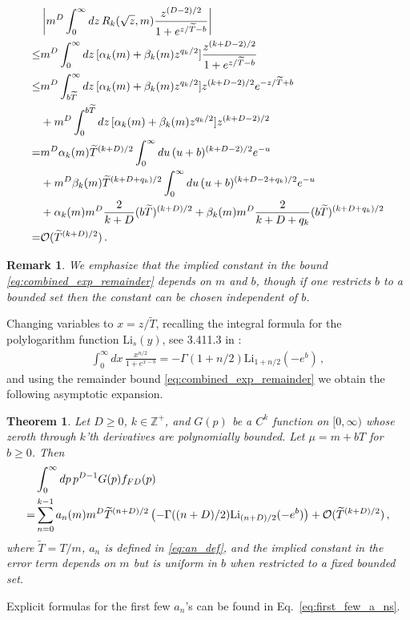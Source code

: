 \documentclass[sn-mathphys,Numbered]{sn-jnl}
\newtheorem{theorem}{Theorem}
\newtheorem{remark}{Remark}
\begin{document}
\begin{align}
 &\left|m^{D}\int_0^\infty dz\, R_k(\sqrt{z},m)\frac{z^{(D-2)/2}}{1+e^{z/\widetilde{T}-b}}\right|\\
 \leq&m^{D}\int_0^\infty dz\, [\alpha_k(m)+\beta_k(m)z^{q_k/2}]\frac{z^{(k+D-2)/2}}{1+e^{z/\widetilde{T}-b}}\notag\\
 \leq &m^{D}\int_{b\widetilde{T}}^\infty dz\, [\alpha_k(m)+\beta_k(m)z^{q_k/2}]z^{(k+D-2)/2}e^{-z/\widetilde{T}+b}\notag\\
 &+m^{D}\int_0^{{b\widetilde{T}}} dz\, [\alpha_k(m)+\beta_k(m)z^{q_k/2}]z^{(k+D-2)/2}\notag\\
 =&m^{D} \alpha_k(m)\widetilde{T}^{(k+D)/2}\int_{0}^\infty du\,(u+b)^{(k+D-2)/2}e^{-u}\notag\\
 &+m^D\beta_k(m)\widetilde{T}^{(k+D+q_k)/2}\int_{0}^\infty du\,(u+b)^{(k+D-2+q_k)/2}e^{-u}\notag\\
 &+\alpha_k(m)m^{D}\frac{2}{k+D}(b\widetilde{T})^{(k+D)/2}+\beta_k(m)m^{D}\frac{2}{k+D+q_k}(b\widetilde{T})^{(k+D+q_k)/2}\notag\\
 =&\mathcal{O}(\widetilde{T}^{(k+D)/2})\,.\label{eq:combined_exp_remainder}
\end{align}
\begin{remark}\label{remark:combined_remainder_uniform_in_b}
We emphasize that the implied constant in the bound \eqref{eq:combined_exp_remainder} depends on $m$ and $b$, though if one restricts $b$ to a bounded set then the constant can be chosen independent of $b$. 
\end{remark}

Changing variables to $x=z/\widetilde{T}$, recalling the integral formula for the polylogarithm function $\mathrm{Li}_s(y)$, see 3.411.3 in  \cite{Gradshteyn:1943cpj}:
\begin{align}\label{eq:h_decomp_eval}
   \int_0^\infty dx \, \frac{x^{n/2}}{1+e^{x-b}}    =-\Gamma(1+n/2)\mathrm{Li}_{1+n/2}(-e^b)\,,
\end{align}
and using the  remainder bound \eqref{eq:combined_exp_remainder} we obtain the following asymptotic expansion.
\begin{theorem}\label{thm:asymp_FD_int_Delta_mu_small}
Let $D\geq 0$, $k\in\mathbb{Z}^+$, and $G(p)$ be a  $C^k$ function on $[0,\infty)$ whose zeroth through $k$'th derivatives are polynomially bounded.  Let $\mu=m+bT$ for $b\geq 0$. Then
\begin{align}\label{eq:asymp_FD_int}
&\int_0^\infty dp\, p^{D-1} G(p) f_{FD}(p)\notag\\
   =&\sum_{n=0}^{k-1} a_n(m)m^{D}\widetilde{T}^{(n+D)/2}\left(-\Gamma((n+D)/2)\mathrm{Li}_{(n+D)/2}(-e^b)\right)+\mathcal{O}(\widetilde{T}^{(k+D)/2})\,,
\end{align}
where $\widetilde{T}=T/m$, $a_n$ is defined in \eqref{eq:an_def}, and the implied constant in the error term depends on $m$ but is uniform in $b$ when restricted to a fixed bounded set. 
\end{theorem}
Explicit formulas for the first few $a_n$'s can be found in Eq.~\eqref{eq:first_few_a_ns}.
\end{document}
